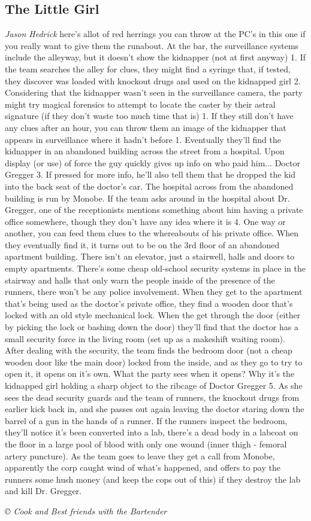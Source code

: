 \documentclass[letterpaper,onecolumn,10pt]{article}
\renewcommand{\textsc}[1]{{\fontspec{Friz Quadrata SC TT}\selectfont #1}}
\newcommand{\getyear}[1]{\StrLeft{#1}{4}}
\newenvironment{scenario}[6]
	{
		\section[#1 {\small\textsc{[#2]}}]{#1} \nopagebreak

		\noindent{\textsc{#2}}\nopagebreak

		\noindent\textit{#3}\nopagebreak
		\def\TMPSCENARIO{{\small\textit{©\getyear{#5}{} #4}}}
	}
	{\TMPSCENARIO}
\newcommand{\sectionlabel}[1]{\textbf{#1: }}
\newcommand{\johnson}[2]{\sectionlabel{Johnson: #1 (#2)}}
\newcommand{\synopsis}{\sectionlabel{Synopsis}}
\begin{document}
\begin{multicols}{2}
\begin{scenario}{The Little Girl}
\johnson{Jason Hedrick}{Cook and Best friends with the Bartender} 

\synopsis  There's allot of red herrings you can throw at the PC's in this one if you really want to give them the runabout. At the bar, the surveillance systems include the alleyway, but it doesn't show the kidnapper (not at first anyway) 1. If the team searches the alley for clues, they might find a syringe that, if tested, they discover was loaded with knockout drugs and used on the kidnapped girl 2. Considering that the kidnapper wasn't seen in the surveillance camera, the party might try magical forensics to attempt to locate the caster by their astral signature (if they don't waste too much time that is) 1. If they still don't have any clues after an hour, you can throw them an image of the kidnapper that appears in surveillance where it hadn't before 1. Eventually they'll find the kidnapper in an abandoned building across the street from a hospital. Upon display (or use) of force the guy quickly gives up info on who paid him... Doctor Gregger 3. If pressed for more info, he'll also tell them that he dropped the kid into the back seat of the doctor's car. The hospital across from the abandoned building is run by Monobe. If the team asks around in the hospital about Dr. Gregger, one of the receptionists mentions something about him having a private office somewhere, though they don't have any idea where it is 4. One way or another, you can feed them clues to the whereabouts of his private office. When they eventually find it, it turns out to be on the 3rd floor of an abandoned apartment building. There isn't an elevator, just a stairwell, halls and doors to empty apartments. There's some cheap old-school security systems in place in the stairway and halls that only warn the people inside of the presence of the runners, there won't be any police involvement. When they get to the apartment that's being used as the doctor's private office, they find a wooden door that's locked with an old style mechanical lock. When the get through the door (either by picking the lock or bashing down the door) they'll find that the doctor has a small security force in the living room (set up as a makeshift waiting room). After dealing with the security, the team finds the bedroom door (not a cheap wooden door like the main door) locked from the inside, and as they go to try to open it, it opens on it's own. What the party sees when it opens? Why it's the kidnapped girl holding a sharp object to the ribcage of Doctor Gregger 5. As she sees the dead security guards and the team of runners, the knockout drugs from earlier kick back in, and she passes out again leaving the doctor staring down the barrel of a gun in the hands of a runner. If the runners inspect the bedroom, they'll notice it's been converted into a lab, there's a dead body in a labcoat on the floor in a large pool of blood with only one wound (inner thigh - femoral artery puncture). As the team goes to leave they get a call from Monobe, apparently the corp caught wind of what's happened, and offers to pay the runners some hush money (and keep the cops out of this) if they destroy the lab and kill Dr. Gregger.


\end{scenario}
\end{multicols}
\end{document}
